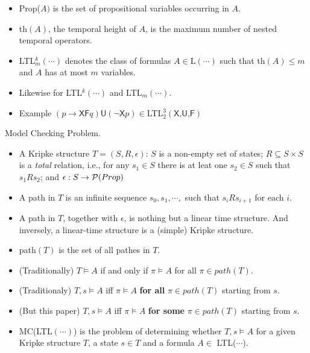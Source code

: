 \documentclass[12pt]{article}
\begin{document}
\begin{itemize}
\item Prop($A)$ is the set of propositional variables occurring in $A$.

\item th$(A)$, the temporal height of $A$, is the maximum number of nested temporal operators.

\item LTL$^k_m(\cdots)$ denotes the class of  formulas $A\in$L$(\cdots)$ such that th$(A)\leq m$ and $A$ has at most $m$ variables.
\item Likewise for LTL$^k(\cdots)$ and LTL$_m(\cdots)$.
\item Example $(p\rightarrow \textsf{XF}q)\textsf{U}(\neg\textsf{X}p)\in$LTL$_2^3(\textsf{X,U,F})$
\end{itemize}


Model Checking Problem.

\begin{itemize}
\item A Kripke structure $T=(S, R,\epsilon)$: $S$ is a non-empty set of states; $R\subseteq S\times S$ is a {\em total} relation, i.e., for any $s_1\in S$ there is at leat one $s_2\in S$ such that $s_1Rs_2$; and $\epsilon: S\rightarrow {\cal P}(Prop)$
\item A path in $T$ is an infinite sequence $s_0, s_1,\cdots,$ such that $s_iRs_{i+1}$ for each $i$.

\item A path in $T$, together with $\epsilon$, is nothing but a linear time structure. And inversely, a linear-time structure is a (simple) Kripke structure.

\item path$(T)$ is the set of all pathes in $T$.

\item (Traditionally) $T\models A$ if and only if $\pi\models A$ for all $\pi\in path(T)$.
\item (Traditionaly) $T,s\models A$ iff $\pi\models A$ {\bf for all} $\pi\in path(T)$ starting from $s$.

\item (But this paper) $T,s\models A$ iff $\pi\models A$ {\bf for some} $\pi\in path(T)$ starting from $s$.

\item MC(LTL$(\cdots)$) is the problem of determining whether $T,s\models A$ for a given Kripke structure $T$, a state $s\in T$ and a formula $A\in$ LTL($\cdots$).
\end{itemize}
\end{document}
